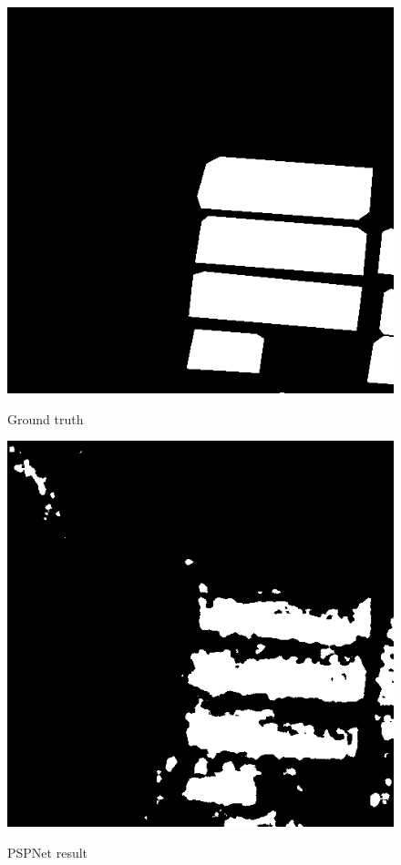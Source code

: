 \documentclass[]{IEEEtran}
\begin{document}
\begin{figure}[!hbt]
		\vspace{0.3cm}
		\begin{center}
			\includegraphics[width=0.9\columnwidth]{gt}
			\caption{Ground truth}
			\label{fig:mp}
		    \vspace{0.2cm}
			\includegraphics[width=0.9\columnwidth]{pred}
			\caption{PSPNet result}
			\label{fig:ss}
		\end{center}
	\end{figure}

\end{document}
